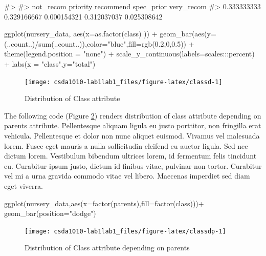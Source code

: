 \begin{Schunk}
\begin{Soutput}
#> 
#>   not_recom    priority   recommend  spec_prior  very_recom 
#> 0.333333333 0.329166667 0.000154321 0.312037037 0.025308642
\end{Soutput}
\begin{Sinput}
ggplot(nursery_data, aes(x=as.factor(class) )) + 
  geom_bar(aes(y= (..count..)/sum(..count..)),color="blue",fill=rgb(0.2,0,0.5)) +
  theme(legend.position = "none") +
  scale_y_continuous(labels=scales:::percent) +
  labs(x = "class",y="total")
\end{Sinput}
\begin{figure}

{\centering \texttt{[image: csda1010-lab1lab1\_files/figure-latex/classd-1]} 

}

\caption[Distribution of Class attribute]{Distribution of Class attribute}\label{fig:classd}
\end{figure}
\end{Schunk}

The following code (Figure \ref{fig:classdp}) renders distribution of
class attribute depending on parents attribute. Pellentesque aliquam
ligula eu justo porttitor, non fringilla erat vehicula. Pellentesque et
dolor non nunc aliquet euismod. Vivamus vel malesuada lorem. Fusce eget
mauris a nulla sollicitudin eleifend eu auctor ligula. Sed nec dictum
lorem. Vestibulum bibendum ultrices lorem, id fermentum felis tincidunt
eu. Curabitur ipsum justo, dictum id finibus vitae, pulvinar non tortor.
Curabitur vel mi a urna gravida commodo vitae vel libero. Maecenas
imperdiet sed diam eget viverra.

\begin{Schunk}
\begin{Sinput}
ggplot(nursery_data,aes(x=factor(parents),fill=factor(class)))+
  geom_bar(position="dodge")
\end{Sinput}
\begin{figure}

{\centering \texttt{[image: csda1010-lab1lab1\_files/figure-latex/classdp-1]} 

}

\caption[Distribution of Class attribute depending on parents]{Distribution of Class attribute depending on parents}\label{fig:classdp}
\end{figure}
\end{Schunk}

